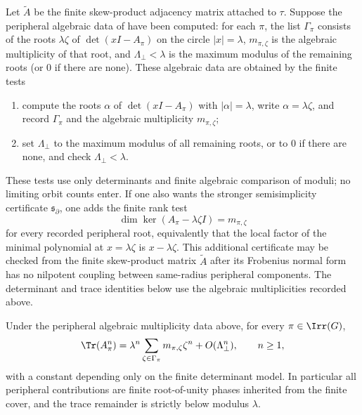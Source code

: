 \begin{lemma}
  \label{lem:finite-cover-peripheral-expansion}
  Let \(\widetilde A\) be the finite skew-product adjacency matrix attached
  to \(\tau\).  Suppose the peripheral algebraic data of
   have been computed: for each
  \(\pi\), the list \(\Gamma_\pi\) consists of the roots
  \(\lambda\zeta\) of \(\det(xI-A_\pi)\) on the circle \(|x|=\lambda\),
  \(m_{\pi,\zeta}\) is the algebraic multiplicity of that root, and
  \(\Lambda_\perp<\lambda\) is the maximum modulus of the remaining roots
  (or \(0\) if there are none).  These algebraic data are obtained by the
  finite tests
  \begin{enumerate}[label=\textup{(\roman*)},leftmargin=*]
    \item compute the roots \(\alpha\) of
      \(\det(xI-A_\pi)\) with \(|\alpha|=\lambda\), write
      \(\alpha=\lambda\zeta\), and record
      \(\Gamma_\pi\) and the algebraic multiplicity \(m_{\pi,\zeta}\);
    \item set \(\Lambda_\perp\) to the maximum modulus of all remaining
    roots, or to \(0\) if there are none, and check
    \(\Lambda_\perp<\lambda\).
  \end{enumerate}
  These tests use only determinants and finite algebraic comparison of
  moduli; no limiting orbit counts enter.
  If one also wants the stronger semisimplicity certificate
  \(\mathfrak s_\partial\), one adds the finite rank test
  \[
    \dim\ker(A_\pi-\lambda\zeta I)=m_{\pi,\zeta}
  \]
  for every recorded peripheral root, equivalently that the local factor of
  the minimal polynomial at \(x=\lambda\zeta\) is \(x-\lambda\zeta\).  This
  additional certificate may be checked from the finite skew-product matrix
  \(\widetilde A\) after its Frobenius normal form has no nilpotent coupling
  between same-radius peripheral components.  The determinant and trace
  identities below use the algebraic multiplicities recorded above.

  Under the peripheral algebraic multiplicity data above, for every
  \(\pi\in\Irr(G)\),
  \begin{equation}\label{eq:finite-cover-peripheral-trace-expansion}
    \Tr(A_\pi^n)=
    \lambda^n\sum_{\zeta\in\Gamma_\pi}m_{\pi,\zeta}\zeta^n
    +O(\Lambda_\perp^n),
    \qquad n\ge1,
  \end{equation}
  with a constant depending only on the finite determinant model.  In
  particular all peripheral contributions are finite root-of-unity phases
  inherited from the finite cover, and the trace remainder is strictly below
  modulus \(\lambda\).
\end{lemma}

